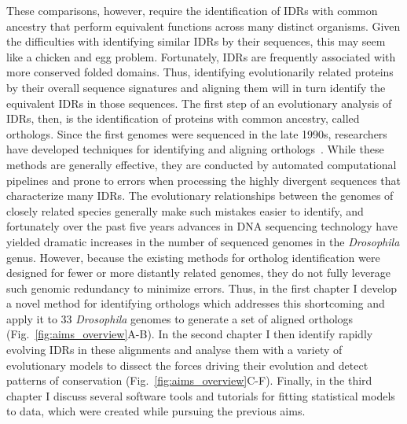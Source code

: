 These comparisons, however, require the identification of IDRs with common ancestry that perform equivalent functions across many distinct organisms. Given the difficulties with identifying similar IDRs by their sequences, this may seem like a chicken and egg problem. Fortunately, IDRs are frequently associated with more conserved folded domains. Thus, identifying evolutionarily related proteins by their overall sequence signatures and aligning them will in turn identify the equivalent IDRs in those sequences. The first step of an evolutionary analysis of IDRs, then, is the identification of proteins with common ancestry, called orthologs. Since the first genomes were sequenced in the late 1990s, researchers have developed techniques for identifying and aligning orthologs~\cite{Fleischmann1995, Goffeau1996, CESC1998, Tatusov1997}. While these methods are generally effective, they are conducted by automated computational pipelines and prone to errors when processing the highly divergent sequences that characterize many IDRs. The evolutionary relationships between the genomes of closely related species generally make such mistakes easier to identify, and fortunately over the past five years advances in DNA sequencing technology have yielded dramatic increases in the number of sequenced genomes in the \textit{Drosophila} genus. However, because the existing methods for ortholog identification were designed for fewer or more distantly related genomes, they do not fully leverage such genomic redundancy to minimize errors. Thus, in the first chapter I develop a novel method for identifying orthologs which addresses this shortcoming and apply it to 33 \textit{Drosophila} genomes to generate a set of aligned orthologs (Fig.~\ref{fig:aims_overview}A-B). In the second chapter I then identify rapidly evolving IDRs in these alignments and analyse them with a variety of evolutionary models to dissect the forces driving their evolution and detect patterns of conservation (Fig.~\ref{fig:aims_overview}C-F). Finally, in the third chapter I discuss several software tools and tutorials for fitting statistical models to data, which were created while pursuing the previous aims.
